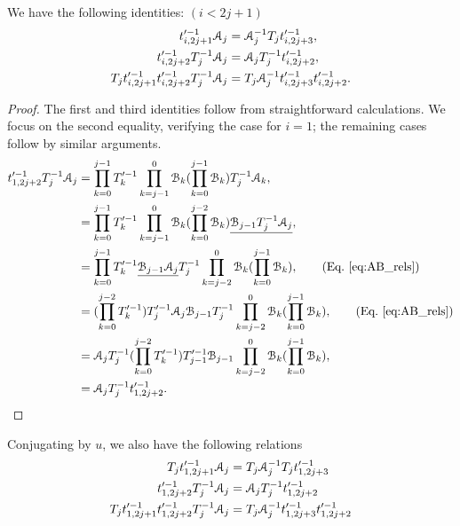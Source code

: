 \documentclass{amsart}
\begin{document}
\begin{lem}\label{Lem:Atrels_boundary}
We have the following identities: $(i<2j+1)$
\[
\begin{aligned}
t'^{-1}_{i,2j+1}\AA_j&=\AA^{-1}_jT_jt'^{-1}_{i,2j+3},\\
t'^{-1}_{i,2j+2}T_j^{-1}\AA_j&=\AA_jT_j^{-1}t'^{-1}_{i,2j+2},\\
T_jt'^{-1}_{i,2j+1}t'^{-1}_{i,2j+2}T_j^{-1}\AA_j&=T_j\AA^{-1}_jt'^{-1}_{i,2j+3}t'^{-1}_{i,2j+2}.
\end{aligned}
\]    
\end{lem}
\begin{proof}
The first and third identities follow from straightforward calculations. We focus on the second equality, verifying the case for $i=1$; the remaining cases follow by similar arguments.
\[
\begin{aligned}
t'^{-1}_{1,2j+2}T_j^{-1}\AA_j&=\prod^{j-1}_{k=0}T'^{-1}_k\prod^{0}_{k=j-1}\BB_k(\prod^{j-1}_{k=0}\BB_k)T^{-1}_j\AA_k,\\
&=\prod^{j-1}_{k=0}T'^{-1}_k\prod^{0}_{k=j-1}\BB_k(\prod^{j-2}_{k=0}\BB_k)\underline{\BB_{j-1}T^{-1}_j\AA_{j}},\\
&=\prod^{j-1}_{k=0}T'^{-1}_k\underline{\BB_{j-1}\AA_{j}}T^{-1}_j\prod^{0}_{k=j-2}\BB_k(\prod^{j-1}_{k=0}\BB_k),\qquad (\text{Eq.~\eqref{eq:AB_rels}})\\
&=(\prod^{j-2}_{k=0}T'^{-1}_k)T'^{-1}_j\AA_j\BB_{j-1}T^{-1}_j\prod^{0}_{k=j-2}\BB_k(\prod^{j-1}_{k=0}\BB_k),\qquad (\text{Eq.~\eqref{eq:AB_rels}})\\
&=\AA_jT^{-1}_j(\prod^{j-2}_{k=0}T'^{-1}_k)T'^{-1}_{j-1}\BB_{j-1}\prod^{0}_{k=j-2}\BB_k(\prod^{j-1}_{k=0}\BB_k),\\
&=\AA_jT_j^{-1}t'^{-1}_{1,2j+2}.
\end{aligned}
\]
\end{proof}

\iffalse
Conjugating by $u$, we also have the following relations
\[
\begin{aligned}
T_jt'^{-1}_{1,2j+1}\AA_j&=T_j\AA^{-1}_jT_jt'^{-1}_{1,2j+3}\\
t'^{-1}_{1,2j+2}T_j^{-1}\AA_j&=\AA_jT_j^{-1}t'^{-1}_{1,2j+2}\\
T_jt'^{-1}_{1,2j+1}t'^{-1}_{1,2j+2}T_j^{-1}\AA_j&=T_j\AA^{-1}_jt'^{-1}_{1,2j+3}t'^{-1}_{1,2j+2}   
\end{aligned}
\]
\end{document}

